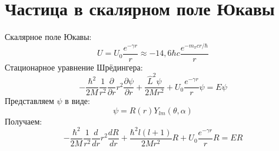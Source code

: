 \section{Частица в скалярном поле Юкавы}

Скалярное поле Юкавы:
\[
U = U_0 \frac{e^{-\gamma r}}{r} \approx - 14{,}6 \hbar c \frac{e^{- m_\pi c r/ \hbar}}{r}
\]
Стационарное уравнение Шрёдингера:
\[
- \frac{\hbar^2}{2M} \frac{1}{r^2} \frac{\partial}{\partial r} r^2 \frac{\partial \psi}{\partial r} + \frac{\hat{L}^2\psi}{2Mr^2} +
U_0 \frac{e^{-\gamma r}}{r} \psi = E \psi
\]
Представляем $\psi$ в виде:
\[
\psi = R(r) Y_{lm}(\theta, \alpha)
\]
Получаем:
\[
- \frac{\hbar^2}{2M} \frac{1}{r^2} \frac{d}{d r} r^2 \frac{d R}{d r} + \frac{\hbar^2 l (l+1)}{2Mr^2} R +
U_0 \frac{e^{-\gamma r}}{r} R = E R
\]